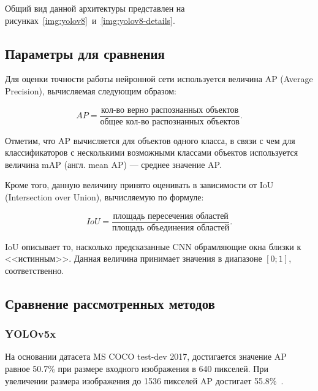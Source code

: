 Общий вид данной архитектуры представлен на рисунках~\ref{img:yolov8}~и~\ref{img:yolov8-details}.




\subsection{Параметры для сравнения}

Для оценки точности работы нейронной сети используется величина AP (Average Precision), вычисляемая следующим образом:

\begin{equation}
	AP = \frac{\text{кол-во верно распознанных объектов}}{\text{общее кол-во распознанных объектов}}.
\end{equation}

Отметим, что AP вычисляется для объектов одного класса, в связи с чем для классификаторов с несколькими возможными классами объектов используется величина mAP (англ. mean AP) --- среднее значение AP.

Кроме того, данную величину принято оценивать в зависимости от IoU (Intersection over Union), вычисляемую по формуле:

\begin{equation}
	IoU = \frac{\text{площадь пересечения областей}}{\text{площадь объединения областей}}.
\end{equation}

IoU описывает то, насколько предсказанные CNN обрамляющие окна близки к <<истинным>>. Данная величина принимает значения в диапазоне $[0;1]$, соответственно.

\subsection{Сравнение рассмотренных методов}

\subsubsection*{YOLOv5x}

На основании датасета MS COCO test-dev 2017, достигается значение AP равное 50.7\% при размере входного изображения в 640 пикселей. При увеличении размера изображения до 1536 пикселей AP достигает 55.8\%~\cite{yolo-review-2023}. 

